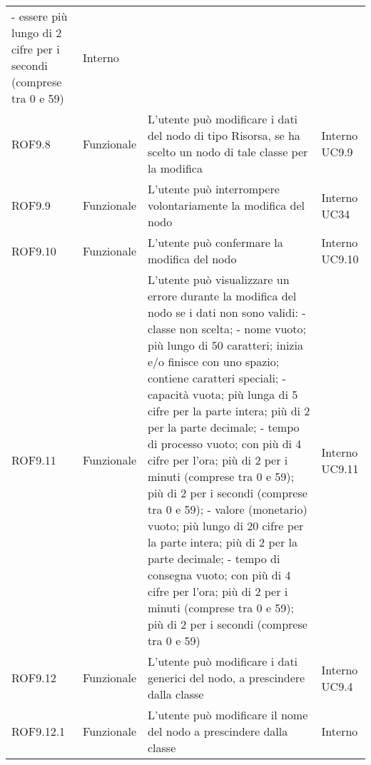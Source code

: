 \begin{longtable}{p{2cm}!{\VRule[1pt]}p{2cm}!{\VRule[1pt]}p{5cm}!{\VRule[1pt]}p{1.5cm}}
	- essere più lungo di 2 cifre per i secondi (comprese tra 0 e 59) & Interno \\
	ROF9.8                           & Funzionale\newline               & L'utente può modificare i dati del nodo di tipo Risorsa, se ha scelto un nodo di tale classe per la modifica             & Interno \newline UC9.9       
	\\
	ROF9.9                           & Funzionale\newline               & L'utente può interrompere volontariamente la modifica del nodo                                                           & Interno \newline UC34        
	\\
		ROF9.10                          & Funzionale\newline               & L'utente può confermare la modifica del nodo                                                                             & Interno \newline UC9.10      
	\\
	ROF9.11&Funzionale\newline  & L'utente può visualizzare un errore durante la modifica del nodo se i dati non sono validi:
	- classe non scelta;
	- nome vuoto; più lungo di 50 caratteri; inizia e/o finisce con uno spazio; contiene caratteri speciali;
	- capacità vuota; più lunga di 5 cifre per la parte intera; più di 2 per la parte decimale;
	- tempo di processo vuoto; con più di 4 cifre per l'ora; più di 2 per i minuti (comprese tra 0 e 59); più di 2 per i secondi (comprese tra 0 e 59);
	- valore (monetario) vuoto; più lungo di 20 cifre per la parte intera; più di 2 per la parte decimale;
	- tempo di consegna vuoto; con più di 4 cifre per l'ora; più di 2 per i minuti (comprese tra 0 e 59); più di 2 per i secondi (comprese tra 0 e 59) & Interno \newline UC9.11
	\\
	ROF9.12                          & Funzionale\newline               & L'utente può modificare i dati generici del nodo, a prescindere dalla classe                                             & Interno \newline UC9.4       
	\\
	ROF9.12.1                        & Funzionale\newline               & L'utente può modificare il nome del nodo a prescindere dalla classe                                                      & Interno                      \\

\end{longtable}
